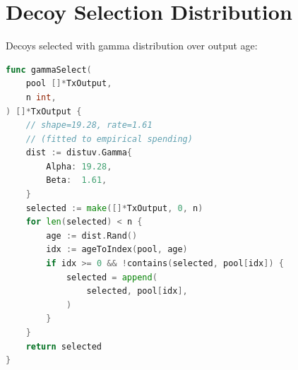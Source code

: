 \documentclass[11pt,a4paper]{article}
\begin{document}
\section{Decoy Selection Distribution}
\label{app:decoy-dist}

Decoys selected with gamma distribution over output age:

\begin{lstlisting}[language=Go,caption={Gamma Distribution Selection}]
func gammaSelect(
    pool []*TxOutput,
    n int,
) []*TxOutput {
    // shape=19.28, rate=1.61
    // (fitted to empirical spending)
    dist := distuv.Gamma{
        Alpha: 19.28,
        Beta:  1.61,
    }
    selected := make([]*TxOutput, 0, n)
    for len(selected) < n {
        age := dist.Rand()
        idx := ageToIndex(pool, age)
        if idx >= 0 && !contains(selected, pool[idx]) {
            selected = append(
                selected, pool[idx],
            )
        }
    }
    return selected
}
\end{lstlisting}
\end{document}
